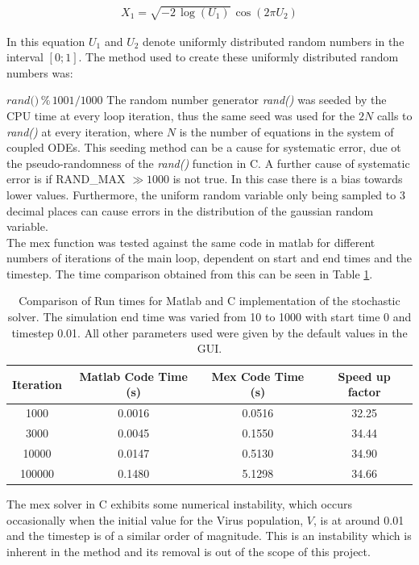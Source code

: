 \documentclass[a4paper, 12pt]{report}
\begin{document}
\begin{align}
\label{eqn:boxMueller}
X_1 = \sqrt{ -2\, \log(U_1)}\, \cos(2 \pi U_2) 
\end{align}

In this equation $U_1$ and $U_2$ denote uniformly distributed random numbers in the interval $[0;1]$. The method used to create these uniformly distributed random numbers was: 

$\textit{rand()}\,\%\, 1001 / 1000$ 
The random number generator \textit{rand()} was seeded by the CPU time at every loop iteration, thus the same seed was used for the $2N$ calls to \textit{rand()} at every iteration, where $N$ is the number of equations in the system of coupled ODEs. This seeding method can be a cause for systematic error, due ot the pseudo-randomness of the \textit{rand()} function in C. A further cause of systematic error is if RAND\_MAX $\gg 1000$ is not true. In this case there is a bias towards lower values. Furthermore, the uniform random variable only being sampled to 3 decimal places can cause errors in the distribution of the gaussian random variable.\\

The mex function was tested against the same code in matlab for different numbers of iterations of the main loop, dependent on start and end times and the timestep. The time comparison obtained from this can be seen in Table \ref{tbl:matlabCComparison}.

\begin{table}
\centering
\begin{tabular}{ | c | c | c | c | }
\hline
Iteration & Matlab Code Time (s) & Mex Code Time (s) & Speed up factor \\ \hline
1000 & 0.0016 & 0.0516 & 32.25 \\ \hline
3000 & 0.0045 & 0.1550 & 34.44 \\ \hline
10000 & 0.0147 & 0.5130 & 34.90 \\ \hline
100000 & 0.1480 & 5.1298 & 34.66 \\
\hline
\end{tabular}
\caption{Comparison of Run times for Matlab and C implementation of the stochastic solver. The simulation end time was varied from 10 to 1000 with start time 0 and timestep 0.01. All other parameters used were given by the default values in the GUI.}
\label{tbl:matlabCComparison}
\end{table}

The mex solver in C exhibits some numerical instability, which occurs occasionally when the initial value for the Virus population, $V$, is at around 0.01 and the timestep is of a similar order of magnitude. This is an instability which is inherent in the method and its removal is out of the scope of this project. \\
\end{document}
